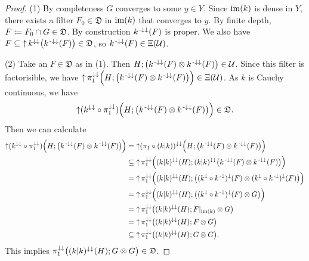 \begin{proof}
(1) By completeness $G$ converges to some $y\in Y$. Since $\im(k)$ is dense in $Y$, there exists a filter $F_0\in \mathfrak{D}$ in $\im(k)$ that converges to $y$. By finite depth, $F\defeq F_0\cap G \in \mathfrak{D}$. By construction $k^{\preimf\imf}(F)$ is proper. We also have $F\subseteq \upset k^{\imf\imf}\big(k^{\preimf\imf}(F)\big) \in \mathfrak{D}$, so $k^{\preimf\imf}(F) \in \Xi(\mathcal{U})$.

(2) Take an $F\in \mathfrak{D}$ as in (1). Then $H; \big(k^{\preimf\imf}(F) \otimes k^{\preimf\imf}(F)\big) \in \mathcal{U}$. Since this filter is factorisible, we have $\upset \proj_1^{\imf\imf}\Big(H; \big(k^{\preimf\imf}(F) \otimes k^{\preimf\imf}(F)\big)\Big) \in \Xi(\mathcal{U})$. As $k$ is Cauchy continuous, we have
\[ \upset (k^{\imf\imf}\circ \proj_1^{\imf\imf})\Big(H; \big(k^{\preimf\imf}(F) \otimes k^{\preimf\imf}(F)\big)\Big) \in \mathfrak{D}. \]
Then we can calculate
\begin{align*}
\upset (k^{\imf\imf}\circ \proj_1^{\imf\imf})\Big(H; \big(k^{\preimf\imf}(F) \otimes k^{\preimf\imf}(F)\big)\Big) &= \upset (\proj_1 \circ (k|k))^{\imf\imf}\Big(H; \big(k^{\preimf\imf}(F) \otimes k^{\preimf\imf}(F)\big)\Big) \\
&\subseteq \upset \proj_1^{\imf\imf}\Big((k|k)^{\imf\imf}(H); (k|k)^{\imf\imf}\big(k^{\preimf\imf}(F) \otimes k^{\preimf\imf}(F)\big)\Big) \\
&= \upset \proj_1^{\imf\imf}\Big((k|k)^{\imf\imf}(H);\big((k^\imf\circ k^\preimf)^{\imf}(F) \otimes (k^\imf\circ k^\preimf)^{\imf}(F)\big)\Big) \\
&= \upset \proj_1^{\imf\imf}\Big((k|k)^{\imf\imf}(H);\big((k^\imf\circ k^\preimf)^{\imf}(F) \otimes G\big)\Big) \\
&= \upset \proj_1^{\imf\imf}\big((k|k)^{\imf\imf}(H);F|_{\im(k)} \otimes G\big) \\
&= \upset \proj_1^{\imf\imf}\big((k|k)^{\imf\imf}(H);F \otimes G \big) \\
&\subseteq \upset \proj_1^{\imf\imf}\big((k|k)^{\imf\imf}(H);G \otimes G\big).
\end{align*}
This implies $\proj_1^{\imf\imf}\big((k|k)^{\imf\imf}(H); G\otimes G\big)\in \mathfrak{D}$.
\end{proof}

